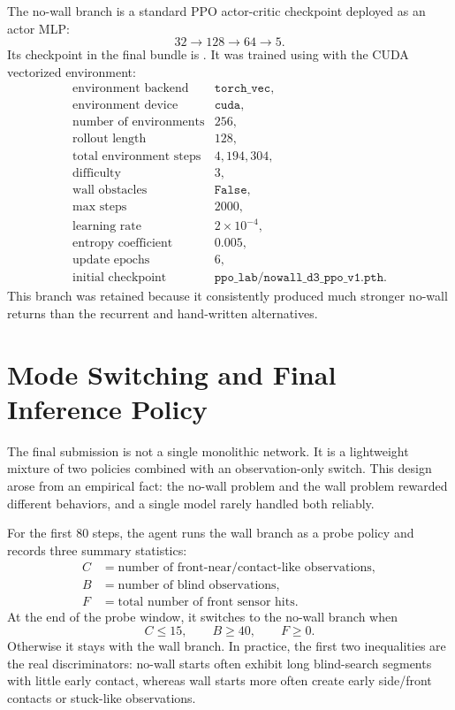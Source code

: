 \documentclass[11pt]{article}
\begin{document}
The no-wall branch is a standard PPO actor-critic checkpoint deployed as an actor MLP:
\[
  32 \rightarrow 128 \rightarrow 64 \rightarrow 5.
\]
Its checkpoint in the final bundle is . It was
trained using  with the CUDA vectorized environment:
\[
\begin{array}{ll}
\text{environment backend} & \texttt{torch\_vec},\\
\text{environment device} & \texttt{cuda},\\
\text{number of environments} & 256,\\
\text{rollout length} & 128,\\
\text{total environment steps} & 4{,}194{,}304,\\
\text{difficulty} & 3,\\
\text{wall obstacles} & \texttt{False},\\
\text{max steps} & 2000,\\
\text{learning rate} & 2\times10^{-4},\\
\text{entropy coefficient} & 0.005,\\
\text{update epochs} & 6,\\
\text{initial checkpoint} & \texttt{ppo\_lab/nowall\_d3\_ppo\_v1.pth}.
\end{array}
\]
This branch was retained because it consistently produced much stronger no-wall returns
than the recurrent and hand-written alternatives.

\section{Mode Switching and Final Inference Policy}

The final submission is not a single monolithic network. It is a lightweight mixture of
two policies combined with an observation-only switch. This design arose from an
empirical fact: the no-wall problem and the wall problem rewarded different behaviors,
and a single model rarely handled both reliably.

For the first 80 steps, the agent runs the wall branch as a probe policy and records
three summary statistics:
\[
\begin{aligned}
  C &= \text{number of front-near/contact-like observations},\\
  B &= \text{number of blind observations},\\
  F &= \text{total number of front sensor hits}.
\end{aligned}
\]
At the end of the probe window, it switches to the no-wall branch when
\[
  C \le 15,
  \qquad
  B \ge 40,
  \qquad
  F \ge 0.
\]
Otherwise it stays with the wall branch. In practice, the first two inequalities are the
real discriminators: no-wall starts often exhibit long blind-search segments with little
early contact, whereas wall starts more often create early side/front contacts or
stuck-like observations.
\end{document}
